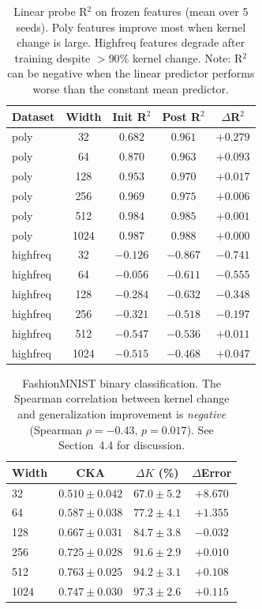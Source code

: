 \documentclass[twoside,11pt]{article}
\begin{document}
\begin{table}[htbp]
    \centering\footnotesize
        \caption{Linear probe R$^2$ on frozen features (mean over 5 seeds).  Poly features improve most when kernel change is large.  Highfreq features degrade after training despite $>90\%$ kernel change.  Note: R$^2$ can be negative when the linear predictor performs worse than the constant mean predictor.}
    \label{tab:linear_probe}
    \begin{tabular}{lcccc}
    \toprule
    Dataset & Width & Init R$^2$ & Post R$^2$ & $\Delta$R$^2$ \\
    \midrule
    poly & 32  & $0.682$ & $0.961$ & $+0.279$ \\
    poly & 64  & $0.870$ & $0.963$ & $+0.093$ \\
    poly & 128 & $0.953$ & $0.970$ & $+0.017$ \\
    poly & 256 & $0.969$ & $0.975$ & $+0.006$ \\
    poly & 512 & $0.984$ & $0.985$ & $+0.001$ \\
    poly & 1024 & $0.987$ & $0.988$ & $+0.000$ \\
    \midrule
    highfreq & 32  & $-0.126$ & $-0.867$ & $-0.741$ \\
    highfreq & 64  & $-0.056$ & $-0.611$ & $-0.555$ \\
    highfreq & 128 & $-0.284$ & $-0.632$ & $-0.348$ \\
    highfreq & 256 & $-0.321$ & $-0.518$ & $-0.197$ \\
    highfreq & 512 & $-0.547$ & $-0.536$ & $+0.011$ \\
    highfreq & 1024 & $-0.515$ & $-0.468$ & $+0.047$ \\
    \bottomrule
    \end{tabular}
\end{table}

\begin{table}[h!]  %
    \centering\footnotesize
        \caption{FashionMNIST binary classification.  The Spearman correlation between kernel change and generalization improvement is \emph{negative} (Spearman $\rho=-0.43$, $p=0.017$).  See Section~4.4 for discussion.}
    \label{tab:fashion}
    \begin{tabular}{lccc}
    \toprule
    Width & CKA & $\Delta K$ (\%) & $\Delta$Error \\
    \midrule
    32   & $0.510\pm0.042$ & $67.0\pm5.2$  & $+8.670$ \\
    64   & $0.587\pm0.038$ & $77.2\pm4.1$  & $+1.355$ \\
    128  & $0.667\pm0.031$ & $84.7\pm3.8$  & $-0.032$ \\
    256  & $0.725\pm0.028$ & $91.6\pm2.9$  & $+0.010$ \\
    512  & $0.763\pm0.025$ & $94.2\pm3.1$  & $+0.108$ \\
    1024 & $0.747\pm0.030$ & $97.3\pm2.6$  & $+0.115$ \\
    \bottomrule
    \end{tabular}
\end{table}
\end{document}
